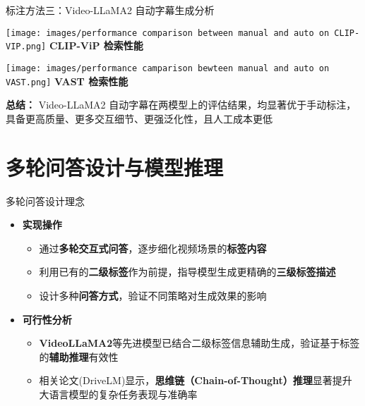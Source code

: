 \documentclass[serif]{beamer}
\begin{document}
\begin{frame}{标注方法三：Video-LLaMA2 自动字幕生成分析}

\begin{minipage}[t]{0.48\textwidth}
  \centering
  \texttt{[image: images/performance comparison between manual and auto on CLIP-VIP.png]}
  \vspace{0.1em}
  \textbf{\small CLIP-ViP 检索性能}
\end{minipage}
\hfill
\begin{minipage}[t]{0.48\textwidth}
  \centering
  \texttt{[image: images/performance camparison bewteen manual and auto on VAST.png]}
  \vspace{0.1em}
  \textbf{\small VAST 检索性能}
\end{minipage}

\vspace{0.2em}

\footnotesize
\textbf{总结：} Video-LLaMA2 自动字幕在两模型上的评估结果，均显著优于手动标注，具备更高质量、更多交互细节、更强泛化性，且人工成本更低
\normalsize

\end{frame}


\section{多轮问答设计与模型推理}

\begin{frame}{多轮问答设计理念}
  \begin{itemize}
    \item \textbf{实现操作}
    \begin{itemize}
      \item 通过\textbf{多轮交互式问答}，逐步细化视频场景的\textbf{标签内容}
      \item 利用已有的\textbf{二级标签}作为前提，指导模型生成更精确的\textbf{三级标签描述}
      \item 设计多种\textbf{问答方式}，验证不同策略对生成效果的影响
    \end{itemize}

    \vspace{1em}

    \item \textbf{可行性分析}
    \begin{itemize}
      \item \textbf{VideoLLaMA2}等先进模型已结合二级标签信息辅助生成，验证基于标签的\textbf{辅助推理}有效性
      \item 相关论文(DriveLM)显示，\textbf{思维链（Chain-of-Thought）推理}显著提升大语言模型的复杂任务表现与准确率
    \end{itemize}
  \end{itemize}
\end{frame}
\end{document}
